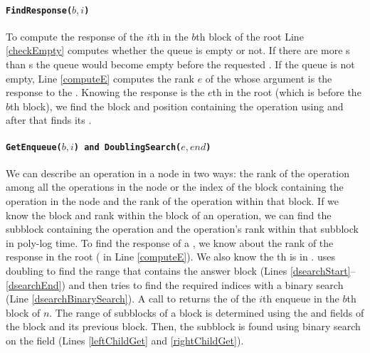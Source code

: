 \paragraph{\tt{FindResponse($b, i$)}}
To compute the response of the $i$th  in the $b$th block
of the root Line \ref{checkEmpty} computes whether the queue is empty
or not. If there are more s than s the queue
would become empty before the requested . If the queue is
not empty, Line \ref{computeE} computes the rank $e$ of the
 whose argument is the response to the
. Knowing the response is the $e$th  in the
root (which is before the $b$th block), we find the block and position
containing the  operation using  and
after that  finds its . 

\paragraph{\tt{GetEnqueue($b,i$)} and \tt{DoublingSearch($e, end$)}}
We can describe an operation in a node in two ways: the rank of the
operation among all the operations in the node or the index of the
block containing the operation in the node and the rank of the
operation within that block. If we know the block and rank within the
block of an operation, we can find the subblock containing the
operation and the operation's rank within that subblock in poly-log
time. To find the response of a , we know about the  rank
of the response  in the root ( in Line
\ref{computeE}). 
We also know the th  is in
.  uses doubling to find
the range that contains the answer block (Lines
\ref{dsearchStart}--\ref{dsearchEnd}) and then tries to find the
required indices with a binary search (Line
\ref{dsearchBinarySearch}). 
A call to  returns the  of the
$i$th enqueue in the $b$th block of $n$. The range of subblocks of a
block is determined using the  and
 fields of the block and its previous block. Then,
the subblock is found using binary search on the 
field (Lines \ref{leftChildGet} and \ref{rightChildGet}). 

